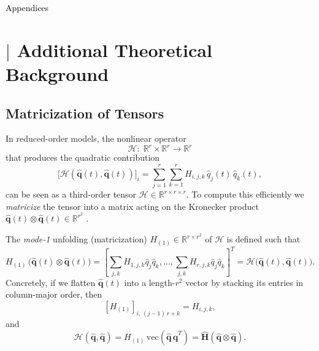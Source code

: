 \begin{center}
    \thispagestyle{empty}
        
    \vspace*{\fill}
    
        {\LARGE\fontsize{26}{26}\selectfont\textcolor{black}{Appendices}\par}
        
    \vspace*{\fill}
\end{center}

\newpage


\chapter{$\vert$ Additional Theoretical Background}
\label{chap:appa}


\section*{Matricization of Tensors}
\label{sec:tensor_matricization}


In reduced-order models, the nonlinear operator\\
$$\mathcal{H}:\;\mathbb{R}^r\times\mathbb{R}^r\to\mathbb{R}^r$$
that produces the quadratic contribution\\
$$\bigl[\mathcal{H}(\hat{\mathbf{q}}(t),\hat{\mathbf{q}}(t))\bigr]_i
=\sum_{j=1}^r\sum_{k=1}^r H_{i,j,k}\,\hat{q}_j(t)\,\hat{q}_k(t),$$
can be seen as a third-order tensor $\mathcal{H}\in\mathbb{R}^{r\times r\times r}$.  To compute this efficiently we \emph{matricize} the tensor into a matrix acting on the Kronecker product $\hat{\mathbf{q}}(t)\otimes\hat{\mathbf{q}}(t)\in\mathbb{R}^{r^2}$ \cite{kolda2009tensor}.  

The \emph{mode-1} unfolding (matricization) $H_{(1)}\in\mathbb{R}^{r\times r^2}$ of $\mathcal{H}$ is defined such that\\
$$
H_{(1)}\,\bigl(\hat{\mathbf{q}}(t)\otimes\hat{\mathbf{q}}(t)\bigr)
= \left[\sum_{j,k}H_{1,j,k}\hat{q}_j\hat{q}_k,\dots,\sum_{j,k}H_{r,j,k}\hat{q}_j\hat{q}_k\right]^T
= \mathcal{H}\bigl(\hat{\mathbf{q}}(t),\hat{\mathbf{q}}(t)\bigr).
$$
Concretely, if we flatten $\hat{\mathbf{q}}(t)$ into a length-$r^2$ vector by stacking its entries in column-major order, then
$$
[H_{(1)}]_{i,\, (j-1)\,r + k} = H_{i,j,k},
$$
and
$$
\mathcal{H}(\hat{\mathbf{q}},\hat{\mathbf{q}}) = H_{(1)}\,\mathrm{vec}(\hat{\mathbf{q}}\,\hat{\mathbf{q}}^T) = \hat{\mathbf{H}}(\hat{\mathbf{q}}\otimes\hat{\mathbf{q}}).$$

